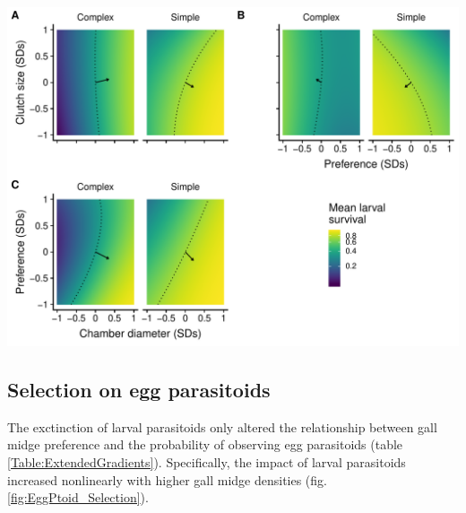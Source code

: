 \documentclass[11pt,]{article}
\let\origfigure\figure
\let\endorigfigure\endfigure
\renewenvironment{figure}[1][2] {
    \expandafter\origfigure\expandafter[H]
} {
    \endorigfigure
}
\begin{document}
\begin{figure}
\centering
\includegraphics{analyses/MV_landscapes.pdf}
\caption{\label{fig:MV_Landscape}Two dimensional view of adaptive
landscapes of gall midge phenotypes in the original food web and with
the extinction of larval parasitoids. Each panel corresponds to a
different combination of phenotypic traits: clutch size and chamber
diameter (A); clutch size and oviposition preference (B); oviposition
preference and chamber diameter (C). Arrows represent mean estimates of
directional selection gradients, while contours represent predicted
larval survival of the mean phenotype in each food-web treatment. Notice
that arrows point more toward a corner of the adaptive landscape for
each combination of traits with the extinction of larval parasitoids
compared to the original food web. This indicates that consumer
extinctions more strongly favored trait integration (covariance). Note
that mean larval survival is plotted on a natural log scale to reflect
the mathematical definition of the adaptive landscape.}
\end{figure}

\subsection{Selection on egg
parasitoids}\label{selection-on-egg-parasitoids}

The exctinction of larval parasitoids only altered the relationship
between gall midge preference and the probability of observing egg
parasitoids (table \ref{Table:ExtendedGradients}). Specifically, the
impact of larval parasitoids increased nonlinearly with higher gall
midge densities (fig. \ref{fig:EggPtoid_Selection}).
\end{document}
